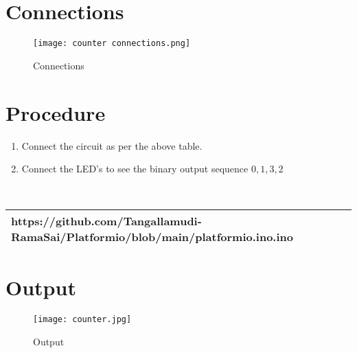 \documentclass[journal,14pt,onecolumn]{IEEEtran}
\begin{document}
\section{\textbf{Connections}}
\begin{figure}[H]
    \centering
    \texttt{[image: counter connections.png]}
    \caption{Connections}
    \label{fig:enter-label}
\end{figure}

\section{\textbf{Procedure}}
\begin{enumerate}
    \item Connect the circuit as per the above table. 
    \item Connect the LED's to see the binary output sequence $0,1,3,2$
\end{enumerate}
\\ \begin{tabularx}{0.46\textwidth} { 
  | >{\centering\arraybackslash}X |}
  \hline
 https://github.com/Tangallamudi-RamaSai/Platformio/blob/main/platformio.ino.ino\\
  \hline
\end{tabularx}
\section{\textbf{Output}}
\begin{figure}[!ht]
    \centering
    \texttt{[image: counter.jpg]}
    \caption{Output}
    \label{fig:enter-label}
\end{figure}
 
\end{document}
